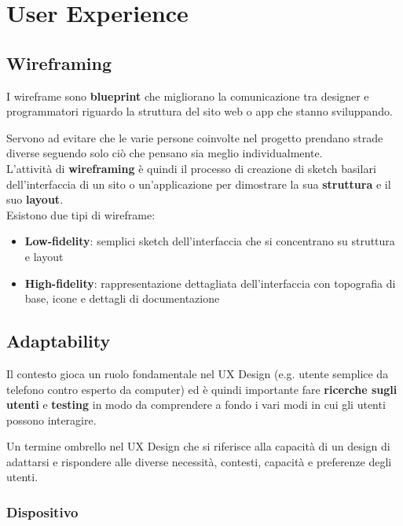 \newpage
\section{User Experience}
\subsection{Wireframing}
\begin{definition}[Wireframe]
	I wireframe sono \textbf{blueprint} che migliorano la comunicazione tra designer e programmatori riguardo la struttura del sito web o app che stanno sviluppando.
\end{definition}
Servono ad evitare che le varie persone coinvolte nel progetto prendano strade diverse seguendo solo ciò che pensano sia meglio individualmente.\\

L'attività di \textbf{wireframing} è quindi il processo di creazione di sketch basilari dell'interfaccia di un sito o un'applicazione per dimostrare la sua \textbf{struttura} e il suo \textbf{layout}.\\

\noindent Esistono due tipi di wireframe:
\begin{itemize}
	\item \textbf{Low-fidelity}: semplici sketch dell'interfaccia che si concentrano su struttura e layout
	\item \textbf{High-fidelity}: rappresentazione dettagliata dell'interfaccia con topografia di base, icone e dettagli di documentazione
\end{itemize}

\subsection{Adaptability}
Il contesto gioca un ruolo fondamentale nel UX Design (e.g. utente semplice da telefono contro esperto da computer) ed è quindi importante fare \textbf{ricerche sugli utenti} e \textbf{testing} in modo da comprendere a fondo i vari modi in cui gli utenti possono interagire.

\begin{definition}[Adaptability]
	Un termine ombrello nel UX Design che si riferisce alla capacità di un design di adattarsi e rispondere alle diverse necessità, contesti, capacità e preferenze degli utenti.
\end{definition}

\subsubsection{Dispositivo}
